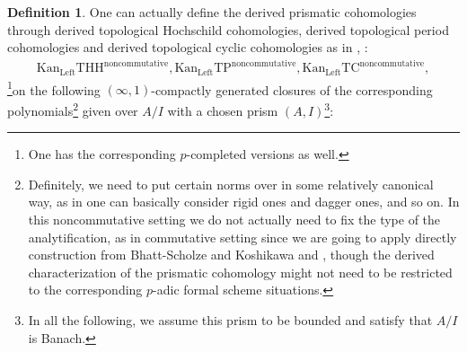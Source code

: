 \documentclass[11pt]{book}
\theoremstyle{definition}
\newtheorem{definition}[theorem]{Definition}
\numberwithin{equation}{section}
\begin{document}
\begin{definition}
\indent One can actually define the derived prismatic cohomologies through derived topological Hochschild cohomologies, derived topological period cohomologies and derived topological cyclic cohomologies as in \cite[Section 2.2, Section 2.3]{12BMS}, \cite[Theorem 1.13]{12BS}:
\begin{align}
	\mathrm{Kan}_{\mathrm{Left}}\mathrm{THH}^\mathrm{noncommutative},\mathrm{Kan}_{\mathrm{Left}}\mathrm{TP}^\mathrm{noncommutative},\mathrm{Kan}_{\mathrm{Left}}\mathrm{TC}^\mathrm{noncommutative},
\end{align}
\footnote{One has the corresponding $p$-completed versions as well.}on the following $(\infty,1)$-compactly generated closures of the corresponding polynomials\footnote{Definitely, we need to put certain norms over in some relatively canonical way, as in \cite[Section 4.2]{BBM} one can basically consider rigid ones and dagger ones, and so on. In this noncommutative setting we do not actually need to fix the type of the analytification, as in commutative setting since we are going to apply directly construction from Bhatt-Scholze and Koshikawa \cite{12BS} and \cite{12Ko1}, though the derived characterization of the prismatic cohomology might not need to be restricted to the corresponding $p$-adic formal scheme situations.} given over $A/I$ with a chosen prism $(A,I)$\footnote{In all the following, we assume this prism to be bounded and satisfy that $A/I$ is Banach.}:



\end{definition}
\end{document}
